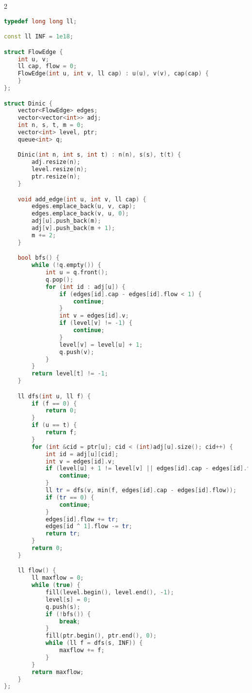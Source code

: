 \documentclass[11pt, a4paper, oneside]{book}
\begin{document}
\begin{multicols}{2}
\begin{lstlisting}[language=C++]
typedef long long ll;

const ll INF = 1e18;

struct FlowEdge {
    int u, v;
    ll cap, flow = 0;
    FlowEdge(int u, int v, ll cap) : u(u), v(v), cap(cap) {
    }
};

struct Dinic {
    vector<FlowEdge> edges;
    vector<vector<int>> adj;
    int n, s, t, m = 0;
    vector<int> level, ptr;
    queue<int> q;

    Dinic(int n, int s, int t) : n(n), s(s), t(t) {
        adj.resize(n);
        level.resize(n);
        ptr.resize(n);
    }

    void add_edge(int u, int v, ll cap) {
        edges.emplace_back(u, v, cap);
        edges.emplace_back(v, u, 0);
        adj[u].push_back(m);
        adj[v].push_back(m + 1);
        m += 2;
    }

    bool bfs() {
        while (!q.empty()) {
            int u = q.front();
            q.pop();
            for (int id : adj[u]) {
                if (edges[id].cap - edges[id].flow < 1) {
                    continue;
                }
                int v = edges[id].v;
                if (level[v] != -1) {
                    continue;
                }
                level[v] = level[u] + 1;
                q.push(v);
            }
        }
        return level[t] != -1;
    }

    ll dfs(int u, ll f) {
        if (f == 0) {
            return 0;
        }
        if (u == t) {
            return f;
        }
        for (int &cid = ptr[u]; cid < (int)adj[u].size(); cid++) {
            int id = adj[u][cid];
            int v = edges[id].v;
            if (level[u] + 1 != level[v] || edges[id].cap - edges[id].flow < 1) {
                continue;
            }
            ll tr = dfs(v, min(f, edges[id].cap - edges[id].flow));
            if (tr == 0) {
                continue;
            }
            edges[id].flow += tr;
            edges[id ^ 1].flow -= tr;
            return tr;
        }
        return 0;
    }

    ll flow() {
        ll maxflow = 0;
        while (true) {
            fill(level.begin(), level.end(), -1);
            level[s] = 0;
            q.push(s);
            if (!bfs()) {
                break;
            }
            fill(ptr.begin(), ptr.end(), 0);
            while (ll f = dfs(s, INF)) {
                maxflow += f;
            }
        }
        return maxflow;
    }
};
\end{lstlisting}
\end{multicols}
\end{document}
